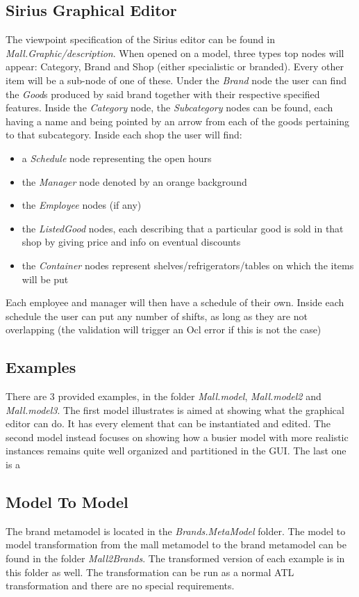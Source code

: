 \documentclass[a4paper]{article}
\begin{document}
\subsection{Sirius Graphical Editor}
The viewpoint specification of the Sirius editor can be found in \textit{Mall.Graphic/description}. When opened on a model, three types top nodes will appear: Category, Brand and Shop (either specialistic or branded). Every other item will be a sub-node of one of these. Under the \textit{Brand} node the user can find the \textit{Good}s produced by said brand together with their respective specified features. Inside the \textit{Category} node, the \textit{Subcategory} nodes can be found, each having a name and being pointed by an arrow from each of the goods pertaining to that subcategory. 
Inside each shop the user will find:
\begin{itemize}
	\item a \textit{Schedule} node representing the open hours
	\item the \textit{Manager} node denoted by an orange background
	\item the \textit{Employee} nodes (if any)
	\item the \textit{ListedGood} nodes, each describing that a particular good is sold in that shop by giving price and info on eventual discounts
	\item the \textit{Container} nodes represent shelves/refrigerators/tables on which the items will be put
\end{itemize}
Each employee and manager will then have a schedule of their own. Inside each schedule the user can put any number of shifts, as long as they are not overlapping (the validation will trigger an Ocl error if this is not the case)

\subsection{Examples}
There are 3 provided examples, in the folder \textit{Mall.model}, \textit{Mall.model2} and \textit{Mall.model3}.
The first model illustrates is aimed at showing what the graphical editor can do. It has every element that can be instantiated and edited.
The second model instead focuses on showing how a busier model with more realistic instances remains quite well organized and partitioned in the GUI.
The last one is a 

\subsection{Model To Model}
The brand metamodel is located in the \textit{Brands.MetaModel} folder.
The model to model transformation from the mall metamodel to the brand metamodel can be found in the folder \textit{Mall2Brands}.  The transformed version of each example is in this folder as well. 
The transformation can be run as a normal ATL transformation and there are no special requirements. 
\end{document}
